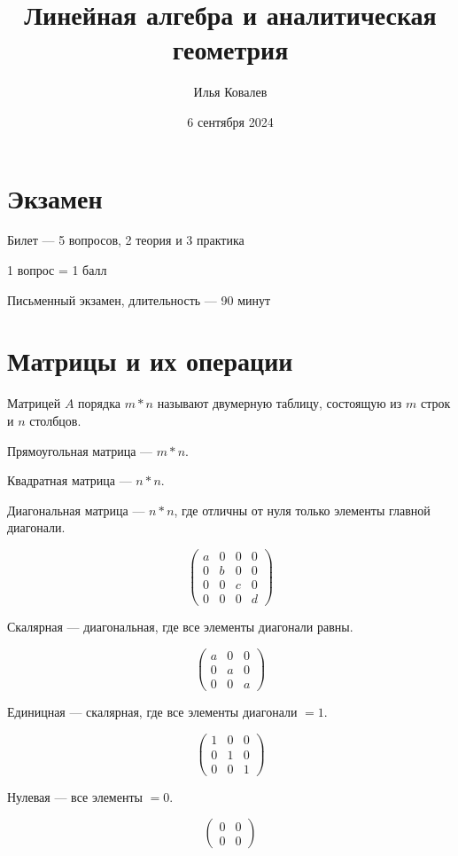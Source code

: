 \documentclass{article}
\begin{document}
\title{Линейная алгебра и аналитическая геометрия}
\author{Илья Ковалев}
\date{6 сентября 2024}
\maketitle

\section{Экзамен}

Билет --- 5 вопросов, 2 теория и 3 практика

1 вопрос = 1 балл

Письменный экзамен, длительность --- 90 минут

\section{Матрицы и их операции}

Матрицей $A$ порядка $m * n$ называют двумерную таблицу, состоящую из $m$ строк и $n$ столбцов.

Прямоугольная матрица --- $m * n$.

Квадратная матрица --- $n * n$.

Диагональная матрица --- $n * n$, где отличны от нуля только элементы главной диагонали.

\[
\begin{pmatrix}
	a & 0 & 0 & 0\\
	0 & b & 0 & 0\\
	0 & 0 & c & 0\\
	0 & 0 & 0 & d
\end{pmatrix}
\]

Скалярная --- диагональная, где все элементы диагонали равны.

\[
\begin{pmatrix}
	a & 0 & 0\\
	0 & a & 0\\
	0 & 0 & a
\end{pmatrix}
\]

Единицная --- скалярная, где все элементы диагонали $= 1$.

\[
\begin{pmatrix}
	1 & 0 & 0\\
	0 & 1 & 0\\
	0 & 0 & 1
\end{pmatrix}
\]

Нулевая --- все элементы $= 0$.

\[
\begin{pmatrix}
	0 & 0 \\
	0 & 0
\end{pmatrix}
\]
\end{document}
